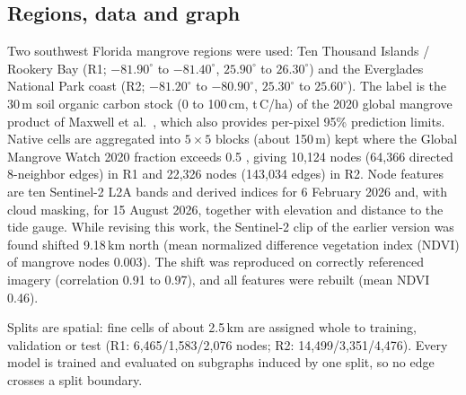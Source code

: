 \documentclass[conference]{IEEEtran}
\begin{document}
\subsection{Regions, data and graph}
Two southwest Florida mangrove regions were used: Ten Thousand Islands / Rookery Bay (R1; $-81.90^\circ$ to $-81.40^\circ$, $25.90^\circ$ to $26.30^\circ$) and the Everglades National Park coast (R2; $-81.20^\circ$ to $-80.90^\circ$, $25.30^\circ$ to $25.60^\circ$).
The label is the 30\,m soil organic carbon stock (0 to 100\,cm, t\,C/ha) of the 2020 global mangrove product of Maxwell et al.\ \cite{maxwell2023soc}, which also provides per-pixel 95\% prediction limits.
Native cells are aggregated into $5\times5$ blocks (about 150\,m) kept where the Global Mangrove Watch 2020 fraction exceeds 0.5 \cite{bunting2022gmw}, giving 10,124 nodes (64,366 directed 8-neighbor edges) in R1 and 22,326 nodes (143,034 edges) in R2.
Node features are ten Sentinel-2 L2A bands and derived indices \cite{drusch2012sentinel2} for 6 February 2026 and, with cloud masking, for 15 August 2026, together with elevation and distance to the tide gauge.
While revising this work, the Sentinel-2 clip of the earlier version was found shifted 9.18\,km north (mean normalized difference vegetation index (NDVI) of mangrove nodes 0.003).
The shift was reproduced on correctly referenced imagery (correlation 0.91 to 0.97), and all features were rebuilt (mean NDVI 0.46).

Splits are spatial: fine cells of about 2.5\,km are assigned whole to training, validation or test (R1: 6,465/1,583/2,076 nodes; R2: 14,499/3,351/4,476).
Every model is trained and evaluated on subgraphs induced by one split, so no edge crosses a split boundary.
\end{document}
